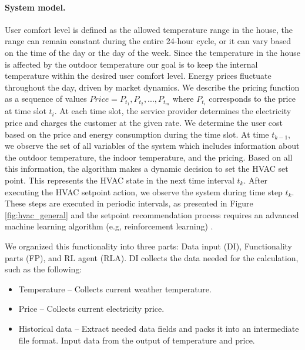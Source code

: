 \paragraph*{System model.}
User comfort level is defined as the allowed temperature range in the house, the range can remain constant during the entire 24-hour cycle, or it can vary based on the time of the day or the day of the week. Since the temperature in the house is affected by the outdoor temperature our goal is to keep the internal temperature within the desired user comfort level. 
Energy prices fluctuate throughout the day, driven by market dynamics. We describe the pricing function as a sequence of values $Price = {P_{t_1}, P_{t_2}, . . . , P_{t_m}}$ where $P_{t_i}$ corresponds to the price at time slot ${t_i}$. At each time slot, the service provider determines the electricity price and charges the customer at the given rate. We determine the user cost based on the price and energy consumption during the time slot. At time $t_{k-1}$, we observe the set of all variables of the system which includes information about the outdoor temperature, the indoor temperature, and the pricing. Based on all this information, the algorithm makes a dynamic decision to set the HVAC set point. This represents the HVAC state in the next time interval $t_k$. After executing the HVAC setpoint action, we observe the system during time step $t_k$. These steps are executed in periodic intervals, as presented in Figure \ref{fig:hvac_general} and the setpoint recommendation process requires an advanced machine learning algorithm (e.g, reinforcement learning) \cite{kotevska2020rl}. %


We organized this functionality into three parts: Data input (DI), Functionality parts (FP), and RL agent (RLA). DI collects the data needed for the calculation, such as the following: %
\begin{itemize}
    \item Temperature -- Collects current weather temperature.
    \item Price -- Collects current electricity price.
    \item Historical data -- Extract needed data fields and packs it into an intermediate file format. Input data from the output of temperature and price.
\end{itemize}

